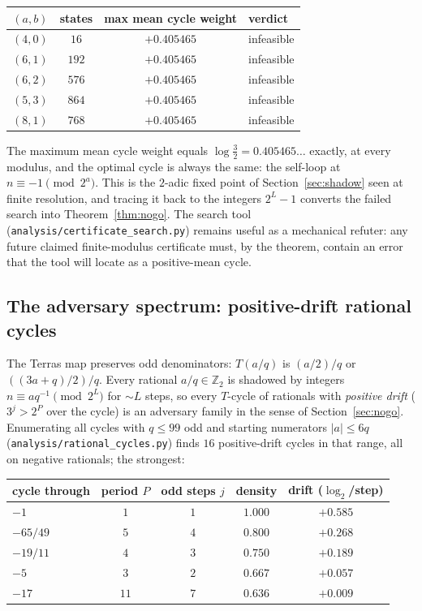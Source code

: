 \documentclass[11pt]{article}
\newcommand{\Z}{\mathbb{Z}}
\newcommand{\Ztwo}{\Z_2}
\newcommand{\code}[1]{\texttt{#1}}
\begin{document}
\begin{center}
\begin{tabular}{cccl}
\toprule
$(a, b)$ & states & max mean cycle weight & verdict\\
\midrule
$(4, 0)$ & $16$  & $+0.405465$ & infeasible\\
$(6, 1)$ & $192$ & $+0.405465$ & infeasible\\
$(6, 2)$ & $576$ & $+0.405465$ & infeasible\\
$(5, 3)$ & $864$ & $+0.405465$ & infeasible\\
$(8, 1)$ & $768$ & $+0.405465$ & infeasible\\
\bottomrule
\end{tabular}
\end{center}

\noindent
The maximum mean cycle weight equals $\log\frac32 = 0.405465\ldots$
exactly, at every modulus, and the optimal cycle is always the same: the
self-loop at $n \equiv -1 \pmod{2^a}$. This is the $2$-adic fixed point
of Section~\ref{sec:shadow} seen at finite resolution, and tracing it
back to the integers $2^L - 1$ converts the failed search into
Theorem~\ref{thm:nogo}. The search tool
(\code{analysis/certificate\_search.py}) remains useful as a mechanical
refuter: any future claimed finite-modulus certificate must, by the
theorem, contain an error that the tool will locate as a positive-mean
cycle.

\subsection{The adversary spectrum: positive-drift rational cycles}
\label{sec:spectrum}

The Terras map preserves odd denominators: $T(a/q)$ is $(a/2)/q$ or
$((3a+q)/2)/q$. Every rational $a/q \in \Ztwo$ is shadowed by integers
$n \equiv a q^{-1} \pmod{2^L}$ for $\sim L$ steps, so every $T$-cycle
of rationals with \emph{positive drift} ($3^j > 2^P$ over the cycle)
is an adversary family in the sense of Section~\ref{sec:nogo}.
Enumerating all cycles with $q \le 99$ odd and starting numerators
$|a| \le 6q$ (\code{analysis/rational\_cycles.py}) finds $16$
positive-drift cycles in that range, all on negative rationals; the
strongest:

\begin{center}
\begin{tabular}{lcccc}
\toprule
cycle through & period $P$ & odd steps $j$ & density & drift ($\log_2$/step)\\
\midrule
$-1$      & $1$  & $1$ & $1.000$ & $+0.585$\\
$-65/49$  & $5$  & $4$ & $0.800$ & $+0.268$\\
$-19/11$  & $4$  & $3$ & $0.750$ & $+0.189$\\
$-5$      & $3$  & $2$ & $0.667$ & $+0.057$\\
$-17$     & $11$ & $7$ & $0.636$ & $+0.009$\\
\bottomrule
\end{tabular}
\end{center}
\end{document}

